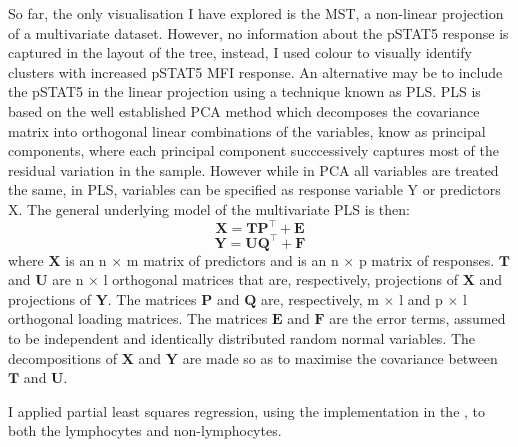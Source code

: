 So far, the only visualisation I have explored is the \gls{MST}, a non-linear projection of a multivariate dataset.
However, no information about the pSTAT5 response is captured in the layout of the tree, instead, I used colour to visually identify clusters with increased pSTAT5 MFI response.
An alternative may be to include the pSTAT5 in the linear projection using a technique known as \acrfull{PLS}.
\gls{PLS} is based on the well established \gls{PCA} method which decomposes the covariance matrix into orthogonal linear combinations of the variables, know as principal components, where each principal component succcessively captures most of the residual variation in the sample.
However while in PCA all variables are treated the same, in PLS, variables can be specified as response variable Y or predictors X.
The general underlying model of the multivariate \gls{PLS} is then:
\[
    \pmb{X} = \pmb{T} \pmb{P}^{\top} + \pmb{E}
\]
\[
    \pmb{Y} = \pmb{U} \pmb{Q}^{\top} + \pmb{F}
\]
where $\pmb{X}$ is an n $\times$ m matrix of predictors and  is an n $\times$ p matrix of responses.
$\pmb{T}$ and $\pmb{U}$ are n $\times$ l orthogonal matrices that are, respectively, projections of $\pmb{X}$ and projections of $\pmb{Y}$.
The matrices $\pmb{P}$ and $\pmb{Q}$ are, respectively, m $\times$ l and p $\times$ l orthogonal loading matrices.
The matrices $\pmb{E}$ and $\pmb{F}$ are the error terms, assumed to be independent and identically distributed random normal variables.  
The decompositions of $\pmb{X}$ and $\pmb{Y}$ are made so as to maximise the covariance between $\pmb{T}$ and $\pmb{U}$.

I applied partial least squares regression,
using the  implementation in the , to both the lymphocytes and non-lymphocytes.
%

